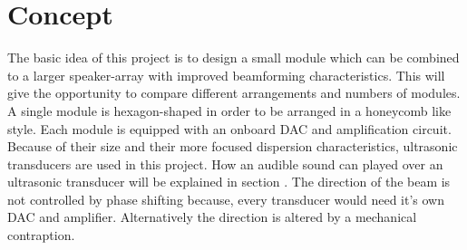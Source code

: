 \chapter{Concept}\label{sec:concept}


The basic idea of this project is to design a small module which can be combined to a larger speaker-array with improved beamforming characteristics. This will give the opportunity to compare different arrangements and numbers of modules. A single module is hexagon-shaped in order to be arranged in a honeycomb like style. Each module is equipped with an onboard DAC and amplification circuit.\p
Because of their size and their more focused dispersion characteristics, ultrasonic transducers are used in this project. How an audible sound can played over an ultrasonic transducer will be explained in section .\p
The direction of the beam is not controlled by phase shifting because, every transducer would need it's own DAC and amplifier. Alternatively the direction is altered by a mechanical contraption.